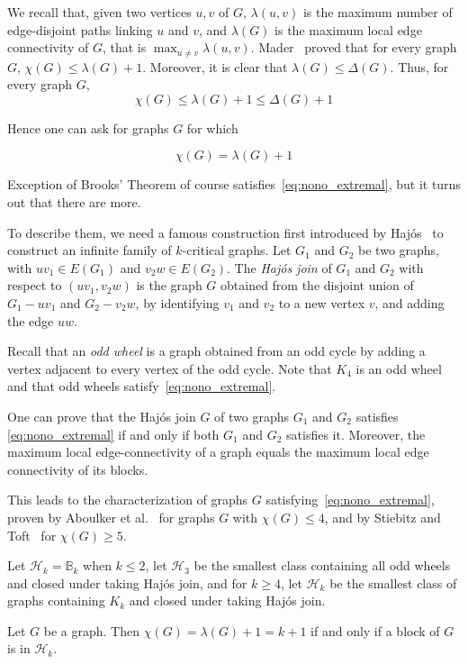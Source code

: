 We recall that, given two vertices $u,v$ of $G$, $\lambda(u,v)$ is the maximum number of edge-disjoint paths linking $u$ and $v$, and $\lambda(G)$ is the maximum local edge connectivity of $G$, that is  $\max_{u\neq v} \lambda(u,v)$.  Mader~\cite{M73} proved that for every graph $G$, $\chi(G) \leq \lambda(G) + 1$. 
Moreover, it is clear that  $\lambda(G) \leq \Delta(G)$.
Thus, for every graph $G$, 
$$ \chi(G) \leq \lambda(G) + 1 \leq \Delta(G) +1$$

Hence one can ask for graphs $G$ for which 


\begin{equation}\label{eq:nono_extremal}
  \chi(G) = \lambda(G) + 1  
\end{equation}

Exception of Brooks' Theorem of course satisfies~\eqref{eq:nono_extremal}, but it turns out that there are more. 

To describe them, we need a famous construction first introduced by Haj\'os~\cite{H61} to construct an infinite family of $k$-critical graphs. Let $G_1$ and $G_2$ be two graphs, with $uv_1 \in E(G_1)$ and  $v_2w \in E(G_2)$. 
The \emph{Haj\'os join} of $G_1$ and $G_2$ with respect to $(uv_1, v_2w)$ is the graph $G$ obtained from the disjoint union of $G_1 - uv_1$ and $G_2 - v_2w$, by identifying $v_1$ and $v_2$ to a new vertex $v$, and adding the edge $uw$. 

Recall that an  \emph{odd wheel} is a graph obtained from an odd cycle by adding a vertex adjacent to every vertex of the odd cycle. Note that $K_4$ is an odd wheel and that odd wheels satisfy~\eqref{eq:nono_extremal}. 

One can prove that the Haj\'os join $G$ of two graphs $G_1$ and $G_2$ satisfies \eqref{eq:nono_extremal} if and only if both $G_1$ and $G_2$ satisfies it. 
Moreover,  the maximum local edge-connectivity of a graph equals the maximum local edge connectivity of its blocks. 

This leads to the characterization of graphs $G$ satisfying~\eqref{eq:nono_extremal}, proven by Aboulker et al.~\cite{ABHMT17} for graphs $G$ with $\chi(G) \leq 4$, and by Stiebitz and Toft~\cite{ST16} for $\chi(G) \geq 5$.  

Let $\mathcal H_k = \mathbb B_k$ when $k \leq 2$, let $\mathcal H_3$ be the smallest class containing all odd wheels and closed under taking Haj\'os join, and for $k \geq 4$, let $\mathcal H_k$ be the smallest class of graphs containing $K_k$ and closed under taking Haj\'os join. 
\begin{theorem}[\cite{ST16}]\label{thm:nono_version}
    Let $G$ be a graph. Then $\chi(G) = \lambda(G) + 1 = k+1$ if and only if a block of $G$ is in $\mathcal H_k$. 
\end{theorem}

